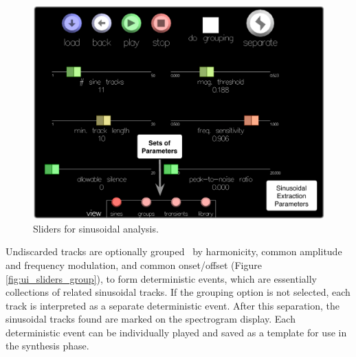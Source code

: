 \documentclass[10pt,letterpaper]{article}
\begin{document}
\begin{figure}[h]
  \begin{center}
    \includegraphics[width=.95\columnwidth]{ui_sliders1.pdf}
    \caption{Sliders for sinusoidal analysis.} 
    \label{fig:ui_sines}
  \end{center}
\end{figure}

Undiscarded tracks are optionally
grouped~\cite{Ellis94,Melih00} by harmonicity, common amplitude
and frequency modulation, and common onset/offset (Figure \ref{fig:ui_sliders_group}), to form deterministic
events, which are essentially collections of related sinusoidal tracks.
If the grouping option is not selected, each track is interpreted as a
separate deterministic event. After this separation, the sinusoidal tracks found are marked on the spectrogram display. Each deterministic event can be individually played and saved as a template for use in the synthesis phase. 
\end{document}
